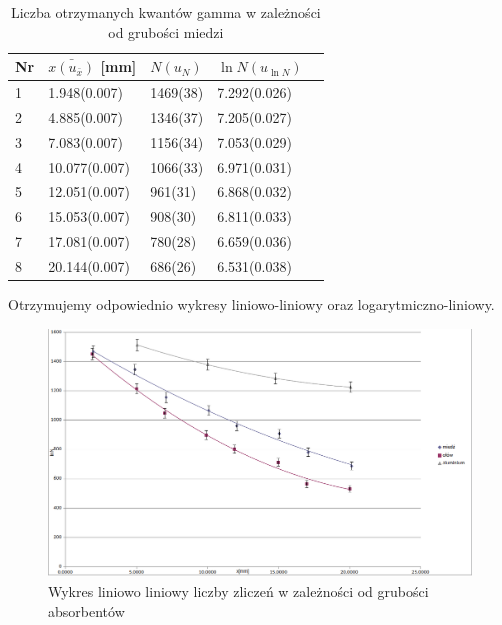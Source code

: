 \documentclass[a4paper]{article}
\begin{document}
\begin{table}[h!]
\centering
\begin{tabular}{ | l | l | l | l | l | }
\hline
Nr & $\bar{x(u_{\bar{x}})}$ [mm] & $N(u_N)$ & $\ln{N}(u_{\ln{N}})$ \\ \hline
1 & 1.948(0.007) & 1469(38) & 7.292(0.026)  \\ \hline
2 & 4.885(0.007) & 1346(37) & 7.205(0.027)  \\ \hline
3 & 7.083(0.007) & 1156(34) & 7.053(0.029) \\ \hline
4 & 10.077(0.007) & 1066(33) & 6.971(0.031) \\ \hline
5 & 12.051(0.007) & 961(31) & 6.868(0.032) \\ \hline
6 & 15.053(0.007) & 908(30) & 6.811(0.033) \\ \hline
7 & 17.081(0.007) & 780(28) & 6.659(0.036) \\ \hline
8 & 20.144(0.007) & 686(26) & 6.531(0.038) \\ \hline   
\end{tabular}
\caption{Liczba otrzymanych kwantów gamma w zależności od grubości miedzi}
\label{pomiary_sruba}
\end{table}

Otrzymujemy odpowiednio wykresy liniowo-liniowy oraz logarytmiczno-liniowy.
\begin{figure}[h!]
\centering
\includegraphics[scale=0.51]{liniowo_liniowy.png}
\caption{Wykres liniowo liniowy liczby zliczeń w zależności od grubości absorbentów}
\label{}
\end{figure}
\end{document}
